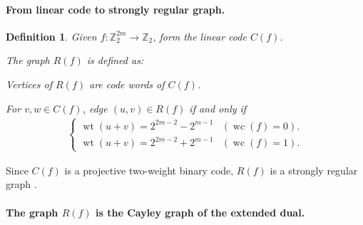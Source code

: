 \documentclass[12pt,a4paper]{article}
\newcommand{\mb}[1]{\mathbb{#1}}
\newcommand{\Z}{\mb{Z}}
\newcommand{\To}{\rightarrow}
\newcommand{\weight}[1]{\operatorname{wt}\left(#1\right)}
\newcommand{\weightclass}[1]{\operatorname{wc}\left(#1\right)}
\newtheorem{Definition}{Definition}
\begin{document}
\paragraph*{From linear code to strongly regular graph.}
\begin{Definition}

Given $f : \Z_2^{2m} \To \Z_2$, form the linear code $C(f)$.

The graph $R(f)$ is defined as:

Vertices of $R(f)$ are code words of $C(f)$.

For $v,w \in C(f)$, edge $(u,v) \in R(f)$ if and only if
\begin{align*}
\begin{cases}
\weight{u+v} = 2^{2m-2} - 2^{m-1} & (\weightclass{f}=0).
\\
\weight{u+v} = 2^{2m-2} + 2^{m-1} & (\weightclass{f}=1).
\end{cases}
\end{align*}

\end{Definition}
Since $C(f)$ is a projective two-weight binary code,
$R(f)$ is a strongly regular graph \cite[Theorem 2]{Del72weights}.

\paragraph*{The graph $R(f)$ is the Cayley graph of the extended dual.}
\end{document}

